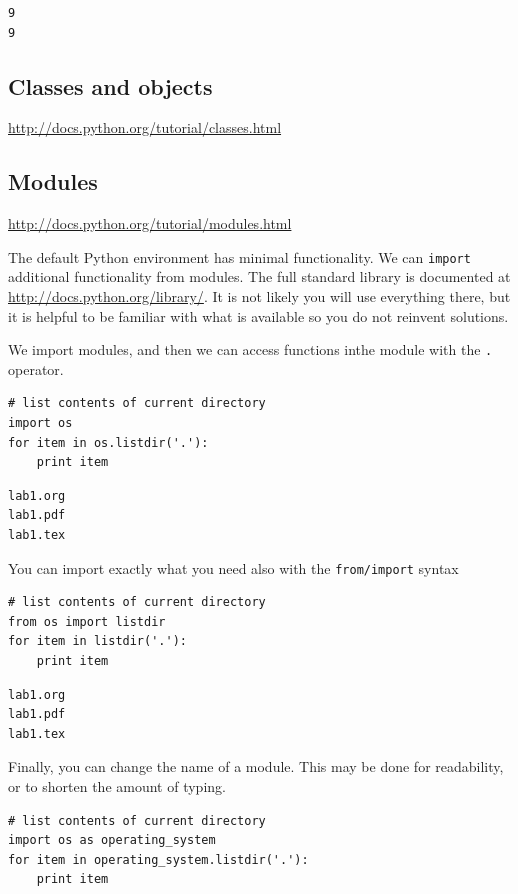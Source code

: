 \documentclass[11pt]{article}
\begin{document}
\begin{verbatim}
9
9
\end{verbatim}


\subsection{Classes and objects}
\label{sec:org3dc2ae2}
\url{http://docs.python.org/tutorial/classes.html}


\subsection{Modules}
\label{sec:org0fd5602}
\url{http://docs.python.org/tutorial/modules.html}

The default Python environment has minimal functionality. We can \texttt{import} additional functionality from modules. The full standard library is documented at \url{http://docs.python.org/library/}. It is not likely you will use everything there, but it is helpful to be familiar with what is available so you do not reinvent solutions.

We import modules, and then we can access functions inthe module with the \texttt{.} operator.

\begin{verbatim}
# list contents of current directory
import os
for item in os.listdir('.'):
    print item
\end{verbatim}

\begin{verbatim}
lab1.org
lab1.pdf
lab1.tex
\end{verbatim}

You can import exactly what you need also with the \texttt{from/import} syntax
\begin{verbatim}
# list contents of current directory
from os import listdir
for item in listdir('.'):
    print item
\end{verbatim}

\begin{verbatim}
lab1.org
lab1.pdf
lab1.tex
\end{verbatim}

Finally, you can change the name of a module. This may be done for readability, or to shorten the amount of typing.
\begin{verbatim}
# list contents of current directory
import os as operating_system
for item in operating_system.listdir('.'):
    print item
\end{verbatim}
\end{document}
